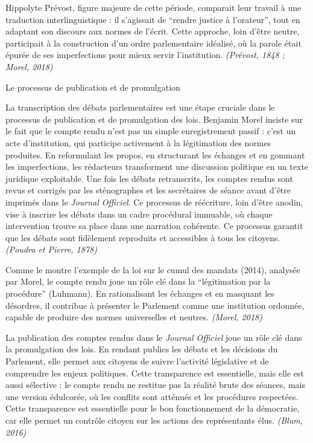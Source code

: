 Hippolyte Prévost, figure majeure de cette période, comparait leur travail à une traduction interlinguistique : il s’agissait de \enquote{rendre justice à l’orateur}, tout en adaptant son discours aux normes de l’écrit. Cette approche, loin d’être neutre, participait à la construction d’un ordre parlementaire idéalisé, où la parole était épurée de ses imperfections pour mieux servir l’institution. \emph{(Prévost, 1848 ; Morel, 2018)}

 Le processus de publication et de promulgation

La transcription des débats parlementaires est une étape cruciale dans le processus de publication et de promulgation des lois. Benjamin Morel insiste sur le fait que le compte rendu n’est pas un simple enregistrement passif : c’est un acte d’institution, qui participe activement à la légitimation des normes produites. En reformulant les propos, en structurant les échanges et en gommant les imperfections, les rédacteurs transforment une discussion politique en un texte juridique exploitable. Une fois les débats retranscrits, les comptes rendus sont revus et corrigés par les sténographes et les secrétaires de séance avant d'être imprimés dans le \emph{Journal Officiel}. Ce processus de réécriture, loin d’être anodin, vise à inscrire les débats dans un cadre procédural immuable, où chaque intervention trouve sa place dans une narration cohérente. Ce processus garantit que les débats sont fidèlement reproduits et accessibles à tous les citoyens. \emph{(Poudra et Pierre, 1878)}

Comme le montre l’exemple de la loi sur le cumul des mandats (2014), analysée par Morel, le compte rendu joue un rôle clé dans la \enquote{légitimation par la procédure} (Luhmann). En rationalisant les échanges et en masquant les désordres, il contribue à présenter le Parlement comme une institution ordonnée, capable de produire des normes universelles et neutres. \emph{(Morel, 2018)}

La publication des comptes rendus dans le \emph{Journal Officiel} joue un rôle clé dans la promulgation des lois. En rendant publics les débats et les décisions du Parlement, elle permet aux citoyens de suivre l'activité législative et de comprendre les enjeux politiques. Cette transparence est essentielle, mais elle est aussi sélective : le compte rendu ne restitue pas la réalité brute des séances, mais une version édulcorée, où les conflits sont atténués et les procédures respectées. Cette transparence est essentielle pour le bon fonctionnement de la démocratie, car elle permet un contrôle citoyen sur les actions des représentants élus. \emph{(Blum, 2016)}


